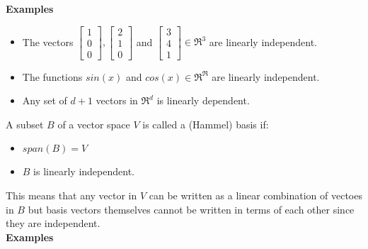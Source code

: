 \textbf{Examples}

\begin{itemize}
	\item The vectors $\begin{bmatrix} 	1 \\ 0 \\ 0 \end{bmatrix}, \begin{bmatrix} 	2 \\ 1 \\ 0 \end{bmatrix}$ and $\begin{bmatrix} 3 \\ 4 \\ 1 \end{bmatrix} \in \Re^3$ are linearly independent. 
	\item The functions $sin(x)$ and $cos(x) \in \Re^\Re$ are linearly independent. 
	\item Any set of $d+1$ vectors in $\Re^d$ is linearly dependent.  
\end{itemize}

\begin{definition}
	A subset $B$ of a vector space $V$ is called a (Hammel) basis if: 
	\begin{itemize}
		\item $span(B) = V$
		\item $B$ is linearly independent. 
	\end{itemize}
\end{definition}

This means that any vector in $V$ can be written as a linear combination of vectoes in $B$ but basis vectors themselves cannot be written in terms of each other since they are independent. \\ 

\textbf{Examples}

